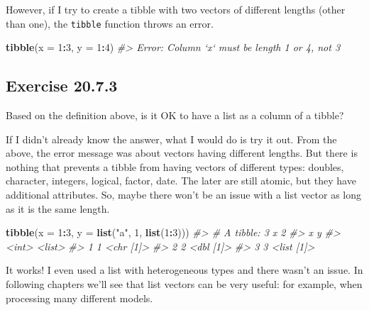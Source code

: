 \documentclass[]{book}
\newenvironment{Shaded}{\begin{snugshade}}{\end{snugshade}}
\newcommand{\CommentTok}[1]{\textcolor[rgb]{0.56,0.35,0.01}{\textit{#1}}}
\newcommand{\DataTypeTok}[1]{\textcolor[rgb]{0.13,0.29,0.53}{#1}}
\newcommand{\DecValTok}[1]{\textcolor[rgb]{0.00,0.00,0.81}{#1}}
\newcommand{\KeywordTok}[1]{\textcolor[rgb]{0.13,0.29,0.53}{\textbf{#1}}}
\newcommand{\NormalTok}[1]{#1}
\newcommand{\OperatorTok}[1]{\textcolor[rgb]{0.81,0.36,0.00}{\textbf{#1}}}
\newcommand{\StringTok}[1]{\textcolor[rgb]{0.31,0.60,0.02}{#1}}
\theoremstyle{plain}
\theoremstyle{remark}
\theoremstyle{definition}
\theoremstyle{definition}
\theoremstyle{definition}
\theoremstyle{remark}
\begin{document}
However, if I try to create a tibble with two vectors of different
lengths (other than one), the \texttt{tibble} function throws an error.

\begin{Shaded}
\begin{Highlighting}[]
\KeywordTok{tibble}\NormalTok{(}\DataTypeTok{x =} \DecValTok{1}\OperatorTok{:}\DecValTok{3}\NormalTok{, }\DataTypeTok{y =} \DecValTok{1}\OperatorTok{:}\DecValTok{4}\NormalTok{)}
\CommentTok{#> Error: Column `x` must be length 1 or 4, not 3}
\end{Highlighting}
\end{Shaded}

\hypertarget{exercise-20.7.3}{%
\subsection*{\texorpdfstring{Exercise
{20.7.3}}{Exercise 20.7.3}}\label{exercise-20.7.3}}

Based on the definition above, is it OK to have a list as a column of a
tibble?

If I didn't already know the answer, what I would do is try it out. From
the above, the error message was about vectors having different lengths.
But there is nothing that prevents a tibble from having vectors of
different types: doubles, character, integers, logical, factor, date.
The later are still atomic, but they have additional attributes. So,
maybe there won't be an issue with a list vector as long as it is the
same length.

\begin{Shaded}
\begin{Highlighting}[]
\KeywordTok{tibble}\NormalTok{(}\DataTypeTok{x =} \DecValTok{1}\OperatorTok{:}\DecValTok{3}\NormalTok{, }\DataTypeTok{y =} \KeywordTok{list}\NormalTok{(}\StringTok{"a"}\NormalTok{, }\DecValTok{1}\NormalTok{, }\KeywordTok{list}\NormalTok{(}\DecValTok{1}\OperatorTok{:}\DecValTok{3}\NormalTok{)))}
\CommentTok{#> # A tibble: 3 x 2}
\CommentTok{#>       x y         }
\CommentTok{#>   <int> <list>    }
\CommentTok{#> 1     1 <chr [1]> }
\CommentTok{#> 2     2 <dbl [1]> }
\CommentTok{#> 3     3 <list [1]>}
\end{Highlighting}
\end{Shaded}

It works! I even used a list with heterogeneous types and there wasn't
an issue. In following chapters we'll see that list vectors can be very
useful: for example, when processing many different models.
\end{document}
